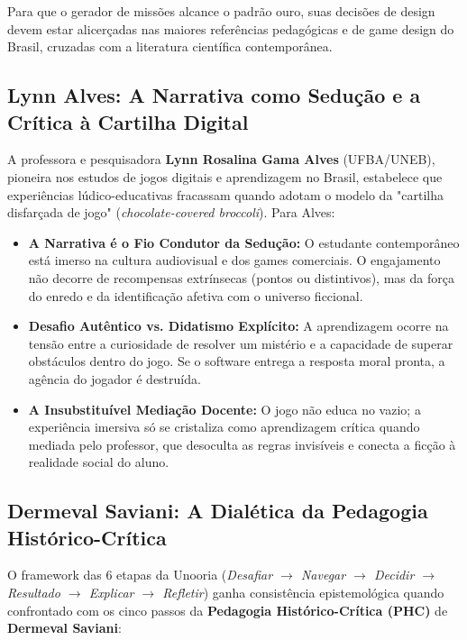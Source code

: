 \documentclass[11pt,a4paper]{article}
\begin{document}
Para que o gerador de miss\~oes alcance o padr\~ao ouro, suas decis\~oes de design devem estar alicer\c{c}adas nas maiores refer\^encias pedag\'ogicas e de game design do Brasil, cruzadas com a literatura cient\'ifica contempor\^anea.

\subsection{Lynn Alves: A Narrativa como Sedu\c{c}\~ao e a Cr\'itica \`a Cartilha Digital}

A professora e pesquisadora \textbf{Lynn Rosalina Gama Alves} (UFBA/UNEB), pioneira nos estudos de jogos digitais e aprendizagem no Brasil, estabelece que experi\^encias l\'udico-educativas fracassam quando adotam o modelo da "cartilha disfar\c{c}ada de jogo" (\emph{chocolate-covered broccoli}). Para Alves:

\begin{itemize}
    \item \textbf{A Narrativa \'e o Fio Condutor da Sedu\c{c}\~ao:} O estudante contempor\^aneo est\'a imerso na cultura audiovisual e dos games comerciais. O engajamento n\~ao decorre de recompensas extr\'insecas (pontos ou distintivos), mas da for\c{c}a do enredo e da identifica\c{c}\~ao afetiva com o universo ficcional.
    \item \textbf{Desafio Aut\^entico vs. Didatismo Expl\'icito:} A aprendizagem ocorre na tens\~ao entre a curiosidade de resolver um mist\'erio e a capacidade de superar obst\'aculos dentro do jogo. Se o software entrega a resposta moral pronta, a ag\^encia do jogador \'e destru\'ida.
    \item \textbf{A Insubstitu\'ivel Media\c{c}\~ao Docente:} O jogo n\~ao educa no vazio; a experi\^encia imersiva s\'o se cristaliza como aprendizagem cr\'itica quando mediada pelo professor, que desoculta as regras invis\'iveis e conecta a fic\c{c}\~ao \`a realidade social do aluno.
\end{itemize}

\subsection{Dermeval Saviani: A Dial\'etica da Pedagogia Hist\'orico-Cr\'itica}

O framework das 6 etapas da Unooria (\emph{Desafiar $\rightarrow$ Navegar $\rightarrow$ Decidir $\rightarrow$ Resultado $\rightarrow$ Explicar $\rightarrow$ Refletir}) ganha consist\^encia epistemol\'ogica quando confrontado com os cinco passos da \textbf{Pedagogia Hist\'orico-Cr\'itica (PHC)} de \textbf{Dermeval Saviani}:
\end{document}
